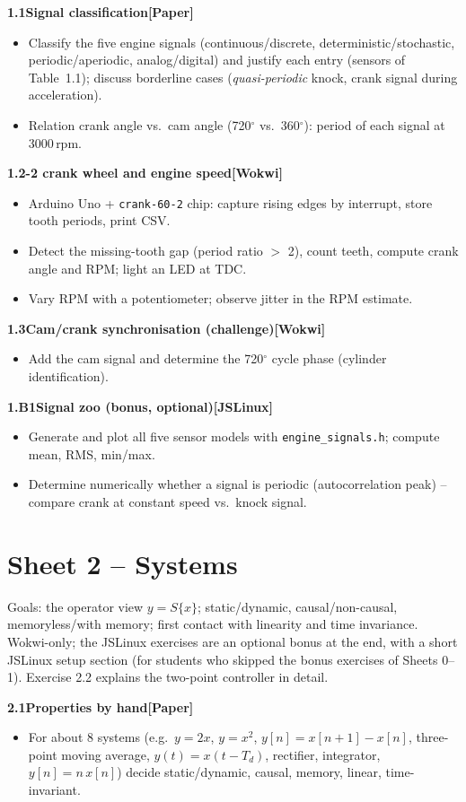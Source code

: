 \documentclass[11pt,a4paper]{article}
\newcommand{\W}{\textsf{\textbf{[Wokwi]}}}
\newcommand{\J}{\textsf{\textbf{[JSLinux]}}}
\newcommand{\Pap}{\textsf{\textbf{[Paper]}}}
\newcommand{\exercise}[4]{%
  \par\smallskip\noindent\textbf{#1\quad #2}\hfill#3\par
  \nopagebreak\begin{itemize}[leftmargin=1.2em]#4\end{itemize}}
\begin{document}
\exercise{1.1}{Signal classification}{\Pap}{
  \item Classify the five engine signals (continuous/discrete,
    deterministic/stochastic, periodic/aperiodic, analog/digital) and
    justify each entry (sensors of Table~1.1); discuss borderline cases
    (\emph{quasi-periodic} knock, crank signal during acceleration).
  \item Relation crank angle vs.\ cam angle (720$^\circ$ vs.\ 360$^\circ$):
    period of each signal at 3000\,rpm.}

\exercise{1.2}{60-2 crank wheel and engine speed}{\W}{
  \item Arduino Uno + \texttt{crank-60-2} chip: capture rising edges by
    interrupt, store tooth periods, print CSV.
  \item Detect the missing-tooth gap (period ratio $>$ 2), count teeth,
    compute crank angle and RPM; light an LED at TDC.
  \item Vary RPM with a potentiometer; observe jitter in the RPM estimate.}

\exercise{1.3}{Cam/crank synchronisation (challenge)}{\W}{
  \item Add the cam signal and determine the 720$^\circ$ cycle phase
    (cylinder identification).}

\exercise{1.B1}{Signal zoo (bonus, optional)}{\J}{
  \item Generate and plot all five sensor models with
    \texttt{engine\_signals.h}; compute mean, RMS, min/max.
  \item Determine numerically whether a signal is periodic (autocorrelation
    peak) -- compare crank at constant speed vs.\ knock signal.}

\section{Sheet 2 -- Systems}
\begin{sheetinfo}
Goals: the operator view $y=S\{x\}$; static/dynamic, causal/non-causal,
memoryless/with memory; first contact with linearity and time invariance.
Wokwi-only; the JSLinux exercises are an optional bonus at the end, with a
short JSLinux setup section (for students who skipped the bonus exercises of
Sheets 0--1). Exercise 2.2 explains the two-point controller in detail.
\end{sheetinfo}

\exercise{2.1}{Properties by hand}{\Pap}{
  \item For about 8 systems (e.g.\ $y=2x$, $y=x^2$, $y[n]=x[n+1]-x[n]$,
    three-point moving average, $y(t)=x(t-T_d)$, rectifier, integrator,
    $y[n]=n\,x[n]$) decide static/dynamic, causal, memory, linear,
    time-invariant.}
\end{document}
